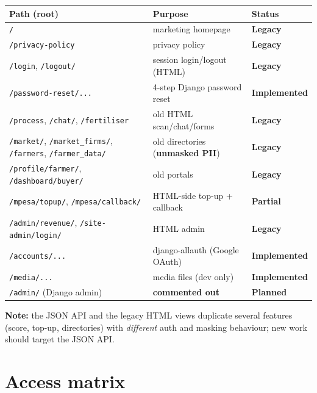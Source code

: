 \documentclass[11pt,a4paper]{article}
\newcommand{\done}{\textcolor{statusdone}{\textbf{Implemented}}}
\newcommand{\partialstatus}{\textcolor{statuspart}{\textbf{Partial}}}
\newcommand{\planned}{\textcolor{statusplan}{\textbf{Planned}}}
\newcommand{\legacy}{\textcolor{statusplan}{\textbf{Legacy}}}
\newcommand{\code}[1]{\texttt{\allowbreak #1\allowbreak}}
\begin{document}
\small
\begin{longtable}{@{} p{} p{} l @{}}
\toprule
\textbf{Path (root)} & \textbf{Purpose} & \textbf{Status} \\
\midrule
\endhead
\code{/}                     & marketing homepage & \legacy \\
\code{/privacy-policy}       & privacy policy & \legacy \\
\code{/login}, \code{/logout/} & session login/logout (HTML) & \legacy \\
\code{/password-reset/...}   & 4-step Django password reset & \done \\
\code{/process}, \code{/chat/}, \code{/fertiliser} & old HTML scan/chat/forms & \legacy \\
\code{/market/}, \code{/market\_firms/}, \code{/farmers}, \code{/farmer\_data/} & old directories (\textbf{unmasked PII}) & \legacy \\
\code{/profile/farmer/}, \code{/dashboard/buyer/} & old portals & \legacy \\
\code{/mpesa/topup/}, \code{/mpesa/callback/} & HTML-side top-up + callback & \partialstatus \\
\code{/admin/revenue/}, \code{/site-admin/login/} & HTML admin & \legacy \\
\code{/accounts/...}         & django-allauth (Google OAuth) & \done \\
\code{/media/...}            & media files (dev only) & \done \\
\code{/admin/} (Django admin) & \textbf{commented out} & \planned \\
\bottomrule
\end{longtable}
\normalsize

\vspace{6pt}
\textbf{Note:} the JSON API and the legacy HTML views duplicate several
features (score, top-up, directories) with \emph{different} auth and
masking behaviour; new work should target the JSON API.

\section{Access matrix}
\end{document}
